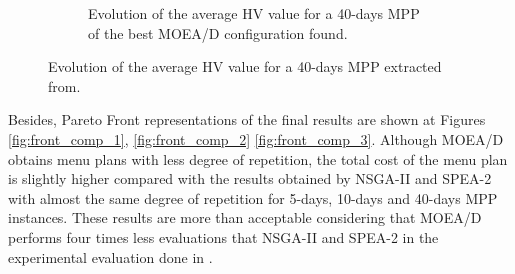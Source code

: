 \begin{figure}[H]
\begin{subfigure}{.9\textwidth}
  \caption{Evolution of the average HV value for a 40-days MPP of the best MOEA/D configuration found.}
\end{subfigure}
\caption{Evolution of the average HV value for a 40-days MPP extracted from\cite{Miranda2018}.}
\label{fig:previous_HV_40}
\end{figure}


Besides, Pareto Front representations of the final results are shown at Figures \ref{fig:front_comp_1}, \ref{fig:front_comp_2} \ref{fig:front_comp_3}. Although MOEA/D obtains menu plans with less degree of repetition, the total cost of the menu plan is slightly higher compared with the results obtained by NSGA-II and SPEA-2 with almost the same degree of repetition for 5-days, 10-days and 40-days MPP instances. These results are more than acceptable considering that MOEA/D performs four times less evaluations that NSGA-II and SPEA-2 in the experimental evaluation done in \cite{Miranda2018}.
